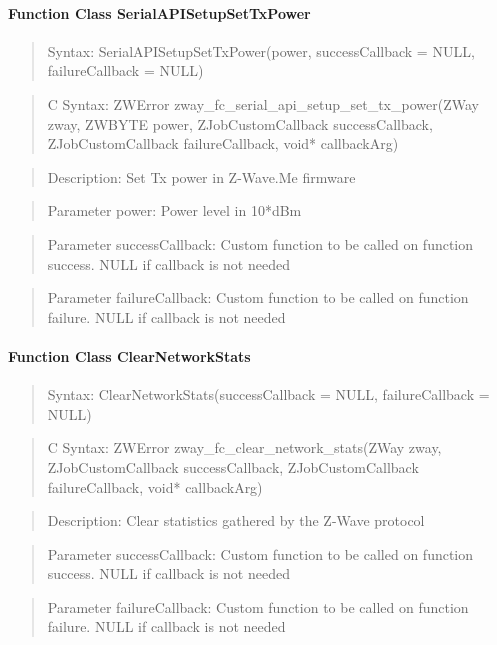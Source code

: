 \paragraph{Function Class SerialAPISetupSetTxPower}
\begin{quote}Syntax: SerialAPISetupSetTxPower(power, successCallback = NULL, failureCallback = NULL)\end{quote}
\begin{quote}C Syntax: ZWError zway\_fc\_serial\_api\_setup\_set\_tx\_power(ZWay zway, ZWBYTE power, ZJobCustomCallback successCallback, ZJobCustomCallback failureCallback, void* callbackArg)\end{quote}
\begin{quote}Description: Set Tx power in Z-Wave.Me firmware\end{quote}
\begin{quote}Parameter power: Power level in 10*dBm\end{quote}
\begin{quote}Parameter successCallback: Custom function to be called on function success. NULL if callback is not needed\end{quote}
\begin{quote}Parameter failureCallback: Custom function to be called on function failure. NULL if callback is not needed\end{quote}


\paragraph{Function Class ClearNetworkStats}
\begin{quote}Syntax: ClearNetworkStats(successCallback = NULL, failureCallback = NULL)\end{quote}
\begin{quote}C Syntax: ZWError zway\_fc\_clear\_network\_stats(ZWay zway, ZJobCustomCallback successCallback, ZJobCustomCallback failureCallback, void* callbackArg)\end{quote}
\begin{quote}Description: Clear statistics gathered by the Z-Wave protocol\end{quote}
\begin{quote}Parameter successCallback: Custom function to be called on function success. NULL if callback is not needed\end{quote}
\begin{quote}Parameter failureCallback: Custom function to be called on function failure. NULL if callback is not needed\end{quote}


